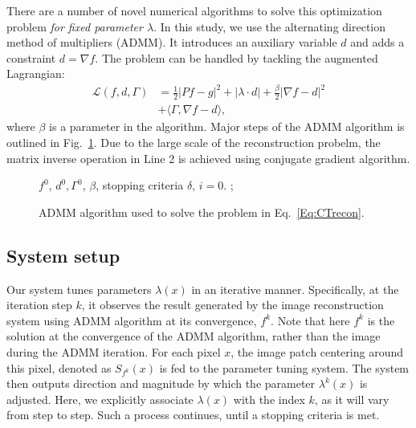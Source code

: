 \documentclass[journal]{IEEEtran}
\begin{document}
There are a number of novel numerical algorithms to solve this optimization problem \emph{for fixed parameter $\lambda$}\cite{Goldstein:SIAM:2009,Chambolle:JMIV:2011,Boyd:FTML:2011}. In this study, we use the alternating direction method of multipliers (ADMM)\cite{Boyd:FTML:2011}. It introduces an auxiliary variable $d$ and adds a constraint $d=\nabla f$. The problem can be handled by tackling the augmented Lagrangian:
\begin{equation}
\begin{split}
\mathcal{L}(f,d,\Gamma) &= \frac{1}{2}|Pf-g|^2+|\lambda\cdot d| +\frac{\beta}{2}|\nabla f-d|^2\\
& + \langle\Gamma,\nabla f-d\rangle,
\end{split}
\end{equation}
where $\beta$ is a parameter in the algorithm. Major steps of the ADMM algorithm is outlined in Fig.~\ref{Fig:ADMM}. Due to the large scale of the reconstruction probelm, the matrix inverse operation in Line 2 is achieved using conjugate gradient algorithm\cite{Golub:2013:matrix}. 

\begin{figure}
\begin{algorithmic}[1]
\REQUIRE $f^0$, $d^0, \Gamma^0$, $\beta$, stopping criteria $\delta$, $i = 0$.
		;
	\ENDIF
\ENDFOR
\end{algorithmic}
\caption{ADMM algorithm used to solve the problem in Eq.~\ref{Eq:CTrecon}.}
\label{Fig:ADMM}
\end{figure}


\subsection{System setup}

Our system tunes parameters $\lambda(x)$ in an iterative manner. Specifically, at the iteration step $k$, it observes the result generated by the image reconstruction system using ADMM algorithm at its convergence, $f^k$. Note that here $f^k$ is the solution at the convergence of the ADMM algorithm, rather than the image during the ADMM iteration. For each pixel $x$, the image patch centering around this pixel, denoted as $S_{f^k}(x)$ is fed to the parameter tuning system. The system then outputs direction and magnitude by which the parameter $\lambda^k(x)$ is adjusted. Here, we explicitly associate $\lambda(x)$ with the index $k$, as it will vary from step to step. Such a process continues, until a stopping criteria is met. 
\end{document}
